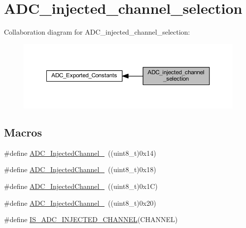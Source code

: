 \hypertarget{group___a_d_c__injected__channel__selection}{}\section{A\+D\+C\+\_\+injected\+\_\+channel\+\_\+selection}
\label{group___a_d_c__injected__channel__selection}
Collaboration diagram for A\+D\+C\+\_\+injected\+\_\+channel\+\_\+selection\+:
\nopagebreak
\begin{figure}[H]
\begin{center}
\leavevmode
\includegraphics[width=350pt]{group___a_d_c__injected__channel__selection}
\end{center}
\end{figure}
\subsection*{Macros}
\begin{DoxyCompactItemize}
\item 
\#define \hyperlink{group___a_d_c__injected__channel__selection_ga8792d4ae0fa82dd317252c72815684ba}{A\+D\+C\+\_\+\+Injected\+Channel\+\_}~((uint8\+\_\+t)0x14)
\item 
\#define \hyperlink{group___a_d_c__injected__channel__selection_ga2e322fccc7de16a0e79be573f5b1211c}{A\+D\+C\+\_\+\+Injected\+Channel\+\_}~((uint8\+\_\+t)0x18)
\item 
\#define \hyperlink{group___a_d_c__injected__channel__selection_ga6bf03d805645b942bdcc53504e772cf1}{A\+D\+C\+\_\+\+Injected\+Channel\+\_}~((uint8\+\_\+t)0x1\+C)
\item 
\#define \hyperlink{group___a_d_c__injected__channel__selection_ga31d18bbcfa7b685e90c3a1313d9c6406}{A\+D\+C\+\_\+\+Injected\+Channel\+\_}~((uint8\+\_\+t)0x20)
\item 
\#define \hyperlink{group___a_d_c__injected__channel__selection_gae0bbfb5dbad0fbac8b672db6f63cf8d0}{I\+S\+\_\+\+A\+D\+C\+\_\+\+I\+N\+J\+E\+C\+T\+E\+D\+\_\+\+C\+H\+A\+N\+N\+EL}(C\+H\+A\+N\+N\+EL)
\end{DoxyCompactItemize}


